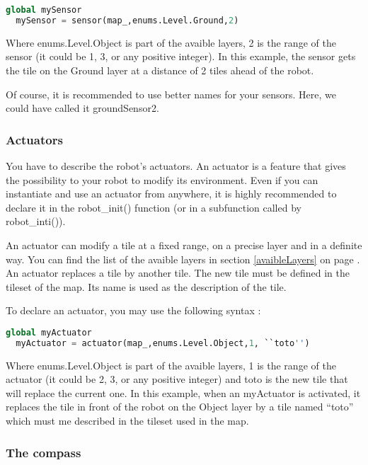 \documentclass[a4paper,11pt]{article}
\begin{document}
\begin{lstlisting}[language=Python]
  global mySensor
  mySensor = sensor(map_,enums.Level.Ground,2)
\end{lstlisting}

Where enums.Level.Object is part of the avaible layers, 2 is the range
of the sensor (it could be 1, 3, or any positive integer). In this
example, the sensor gets the tile on the Ground layer at a distance of
2 tiles ahead of the robot.

Of course, it is recommended to use better names for your
sensors. Here, we could have called it groundSensor2.

\subsubsection{Actuators}

You have to describe the robot's actuators. An actuator is a feature
that gives the possibility to your robot to modify its
environment. Even if you can instantiate and use an actuator from
anywhere, it is highly recommended to declare it in the robot\_init()
function (or in a subfunction called by robot\_inti()).

An actuator can modify a tile at a fixed range, on a precise layer and
in a definite way. You can find the list of the avaible layers in
section \ref{avaibleLayers} on page \pageref{avaibleLayers}. An actuator replaces a tile by another
tile. The new tile must be defined in the tileset of the map. Its name
is used as the description of the tile.

To declare an actuator, you may use the following syntax :

\begin{lstlisting}[language=Python]
  global myActuator
  myActuator = actuator(map_,enums.Level.Object,1, ``toto'')
\end{lstlisting}

Where enums.Level.Object is part of the avaible layers, 1 is the range
of the actuator (it could be 2, 3, or any positive integer) and toto
is the new tile that will replace the current one. In this example,
when an myActuator is activated, it replaces the tile in front of the
robot on the Object layer by a tile named ``toto'' which must me
described in the tileset used in the map.


\subsubsection{The compass}
\end{document}
